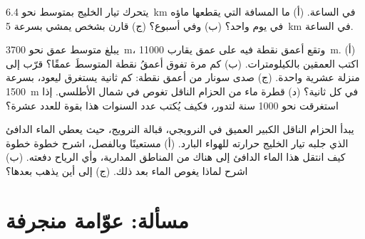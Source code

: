 \begin{exercise}[$\star\star$]\label{exo:g8:the-oceans:10}
يتحرك تيار الخليج بمتوسط نحو \qty{6.4}{km} في الساعة. (أ) ما المسافة التي
يقطعها ماؤه في يوم واحد؟ (ب) وفي أسبوع؟ (ج) قارن بشخص يمشي بسرعة
\qty{5}{km} في الساعة.
\end{exercise}

\begin{exercise}[$\star\star\star$]\label{exo:g8:the-oceans:11}
يبلغ متوسط عمق  نحو \qty{3700}{m}، وتقع أعمق نقطة فيه على عمق يقارب
\qty{11000}{m}. (أ) اكتب العمقين بالكيلومترات. (ب) كم مرة تفوق أعمقُ نقطة
المتوسطَ عمقًا؟ قرّب إلى منزلة عشرية واحدة. (ج) صدى سونار من أعمق نقطة: كم
ثانية يستغرق ليعود، بسرعة \qty{1500}{m} في كل ثانية؟ (د) قطرة ماء من الحزام
الناقل تغوص في شمال الأطلسي. إذا استغرقت نحو \num{1000} سنة لتدور، فكيف
يُكتب عدد السنوات هذا بقوة للعدد عشرة؟
\end{exercise}

\begin{exercise}[$\star\star\star$]\label{exo:g8:the-oceans:12}
يبدأ الحزام الناقل الكبير  العميق في  النرويجي، قبالة 
النرويج، حيث يعطي الماء الدافئ الذي جلبه تيار الخليج حرارته للهواء البارد.
(أ) مستعينًا   وبالفصل، اشرح خطوة خطوة كيف انتقل هذا الماء
الدافئ إلى هناك من المناطق المدارية، وأي الرياح دفعته. (ب) اشرح لماذا يغوص
الماء بعد ذلك. (ج) إلى أين يذهب بعدها؟
\end{exercise}

\section{مسألة: عوّامة منجرفة}

